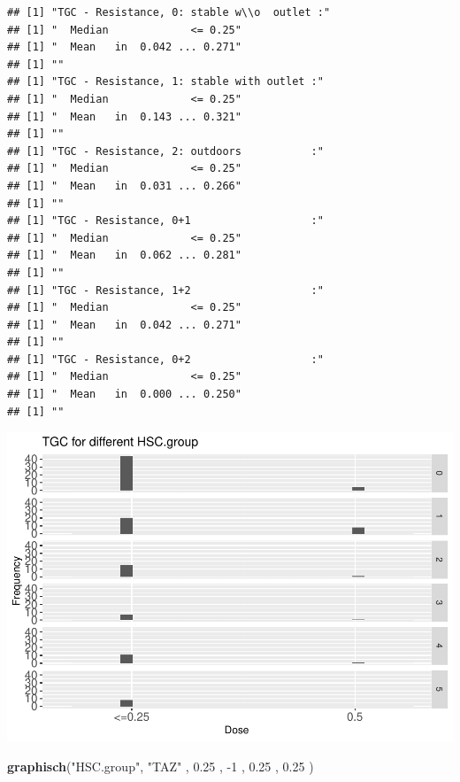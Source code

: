 \documentclass[
]{article}
\newenvironment{Shaded}{\begin{snugshade}}{\end{snugshade}}
\newcommand{\DecValTok}[1]{\textcolor[rgb]{0.00,0.00,0.81}{#1}}
\newcommand{\FloatTok}[1]{\textcolor[rgb]{0.00,0.00,0.81}{#1}}
\newcommand{\KeywordTok}[1]{\textcolor[rgb]{0.13,0.29,0.53}{\textbf{#1}}}
\newcommand{\NormalTok}[1]{#1}
\newcommand{\StringTok}[1]{\textcolor[rgb]{0.31,0.60,0.02}{#1}}
\begin{document}
\begin{verbatim}
## [1] "TGC - Resistance, 0: stable w\\o  outlet :"
## [1] "  Median             <= 0.25"
## [1] "  Mean   in  0.042 ... 0.271"
## [1] ""
## [1] "TGC - Resistance, 1: stable with outlet :"
## [1] "  Median             <= 0.25"
## [1] "  Mean   in  0.143 ... 0.321"
## [1] ""
## [1] "TGC - Resistance, 2: outdoors           :"
## [1] "  Median             <= 0.25"
## [1] "  Mean   in  0.031 ... 0.266"
## [1] ""
## [1] "TGC - Resistance, 0+1                   :"
## [1] "  Median             <= 0.25"
## [1] "  Mean   in  0.062 ... 0.281"
## [1] ""
## [1] "TGC - Resistance, 1+2                   :"
## [1] "  Median             <= 0.25"
## [1] "  Mean   in  0.042 ... 0.271"
## [1] ""
## [1] "TGC - Resistance, 0+2                   :"
## [1] "  Median             <= 0.25"
## [1] "  Mean   in  0.000 ... 0.250"
## [1] ""
\end{verbatim}

\includegraphics{Verteilungen_files/figure-latex/unnamed-chunk-49-1.pdf}

\begin{Shaded}
\begin{Highlighting}[]
   \KeywordTok{graphisch}\NormalTok{(}\StringTok{"HSC.group"}\NormalTok{, }\StringTok{"TAZ"}\NormalTok{ , }\FloatTok{0.25}\NormalTok{ ,  }\DecValTok{-1}\NormalTok{   ,   }\FloatTok{0.25}\NormalTok{ ,   }\FloatTok{0.25}\NormalTok{ )  }
\end{Highlighting}
\end{Shaded}
\end{document}
